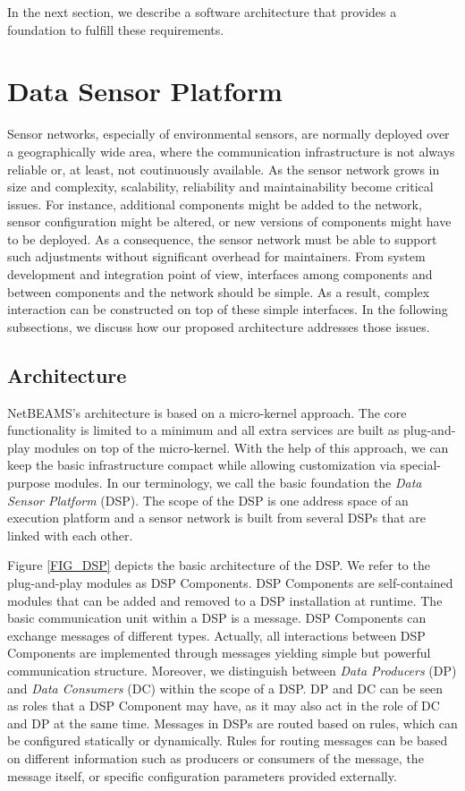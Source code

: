 \documentclass[conference]{IEEEtran}
\begin{document}
In the next section, we describe a software architecture that provides
a foundation to fulfill these requirements.


\section{Data Sensor Platform}
\label{SEC_DSP}

Sensor networks, especially of environmental sensors, are normally
deployed over a geographically wide area, where the communication
infrastructure is not always reliable or, at least, not coutinuously
available. As the sensor network grows in size and complexity, 
scalability, reliability and maintainability become critical issues.
For instance, additional components might be added to the network, sensor
configuration might be altered, or new versions of components might have to be
deployed. As a consequence, the sensor network must be able to support such
adjustments without significant overhead for maintainers.  From system
development and integration point of view, interfaces among components
and between components and the network should be simple. As a result, complex
interaction can be constructed on top of these simple interfaces.  In
the following subsections, we discuss how our proposed architecture addresses
those issues.

\subsection{Architecture}

NetBEAMS's architecture is based on a micro-kernel approach. The core
functionality is limited to a minimum and all extra services are built
as plug-and-play modules on top of the micro-kernel. With the help of
this approach, we can keep the basic infrastructure compact while
allowing customization via special-purpose modules. In our terminology,
we call the basic foundation the \emph{Data Sensor Platform}
(DSP). The scope of the DSP is one address space of an execution
platform and a sensor network is built from several DSPs that are linked
with each other.

Figure \ref{FIG_DSP} depicts the basic architecture of the DSP. We
refer to the plug-and-play modules as DSP Components. DSP Components
are self-contained modules that can be added and removed to a DSP
installation at runtime. The basic communication unit within a DSP
is a message. DSP Components can exchange messages of different types.
Actually, all interactions between DSP Components are implemented
through messages yielding simple but powerful communication
structure. Moreover, we distinguish between \emph{Data Producers} (DP) and
\emph{Data Consumers} (DC) within the scope of a DSP. DP and DC can be
seen as roles that a DSP Component may have, as it may also 
act in the role of DC and DP at the same time. Messages
in DSPs are routed based on rules, which can be configured statically
or dynamically. Rules for routing messages can be based on different
information such as producers or consumers of the message, the message
itself, or specific configuration parameters provided externally.
\end{document}
